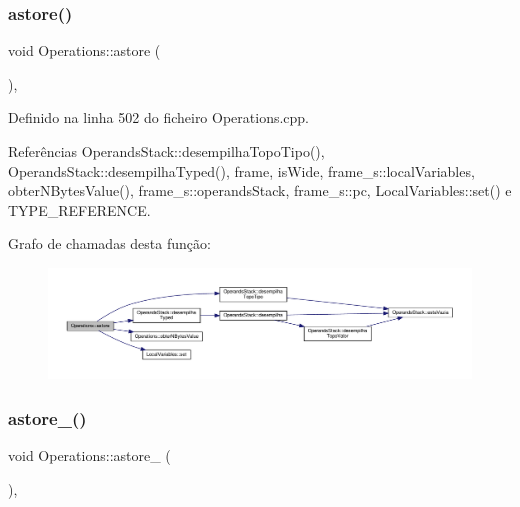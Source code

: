 \subsubsection{\texorpdfstring{astore()}{astore()}}
{\footnotesize\ttfamily void Operations\+::astore (\begin{DoxyParamCaption}{ }\end{DoxyParamCaption})\hspace{0.3cm}{\ttfamily [static]}, {\ttfamily [private]}}



Definido na linha 502 do ficheiro Operations.\+cpp.



Referências Operands\+Stack\+::desempilha\+Topo\+Tipo(), Operands\+Stack\+::desempilha\+Typed(), frame, is\+Wide, frame\+\_\+s\+::local\+Variables, obter\+N\+Bytes\+Value(), frame\+\_\+s\+::operands\+Stack, frame\+\_\+s\+::pc, Local\+Variables\+::set() e T\+Y\+P\+E\+\_\+\+R\+E\+F\+E\+R\+E\+N\+CE.

Grafo de chamadas desta função\+:\nopagebreak
\begin{figure}[H]
\begin{center}
\leavevmode
\includegraphics[width=350pt]{classOperations_aa414424bd203fb9788712fd2e74c3a32_cgraph}
\end{center}
\end{figure}
\mbox{\label{classOperations_a140f2e8501424f8a73dbfecfa3ca859f}} 
\subsubsection{\texorpdfstring{astore\+\_()}{astore\_0()}}
{\footnotesize\ttfamily void Operations\+::astore\+\_ (\begin{DoxyParamCaption}{ }\end{DoxyParamCaption})\hspace{0.3cm}{\ttfamily [static]}, {\ttfamily [private]}}



